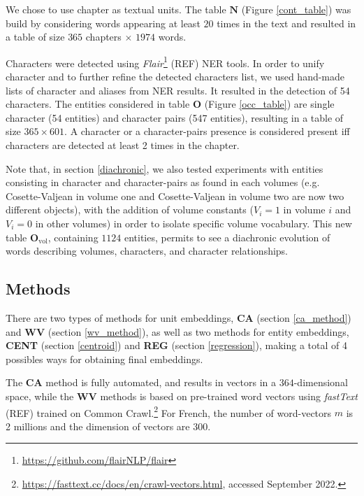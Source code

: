 \documentclass[
twocolumn,
]{ceurart}
\begin{document}
We chose to use chapter as textual units. The table $\mathbf{N}$ (Figure \ref{cont_table}) was build by considering words appearing at least $20$ times in the text and resulted in a table of size $365$ chapters $\times$ $1974$ words.

Characters were detected using \emph{Flair}\footnote{\url{https://github.com/flairNLP/flair}} (REF) NER tools. In order to unify character and to further refine the detected characters list, we used hand-made lists of character and aliases from NER results. It resulted in the detection of 54 characters. The entities considered in table $\mathbf{O}$ (Figure \ref{occ_table}) are single character (54 entities) and character pairs (547 entities), resulting in a table of size $365 \times 601$. A character or a character-pairs presence is considered present iff characters are detected at least 2 times in the chapter. 

Note that, in section \ref{diachronic}, we also tested experiments with entities consisting in character and character-pairs as found in each volumes (e.g. Cosette-Valjean in volume one and Cosette-Valjean in volume two are now two different objects), with the addition of volume constants ($V_i=1$ in volume $i$ and $V_i=0$ in other volumes) in order to isolate specific volume vocabulary. This new table $\mathbf{O}_\text{vol}$, containing $1124$ entities, permits to see a diachronic evolution of words describing volumes, characters, and character relationships. 

\subsection{Methods}

There are two types of methods for unit embeddings, \textbf{CA} (section \ref{ca_method}) and \textbf{WV} (section \ref{wv_method}), as well as two methods for entity embeddings, \textbf{CENT} (section \ref{centroid}) and \textbf{REG} (section \ref{regression}), making a total of 4 possibles ways for obtaining final embeddings. 

The \textbf{CA} method is fully automated, and results in vectors in a $364$-dimensional space, while the $\textbf{WV}$ methods is based on pre-trained word vectors using \emph{fastText} (REF) trained on Common Crawl.\footnote{\url{ https://fasttext.cc/docs/en/crawl-vectors.html}, accessed September 2022.} For French, the number of word-vectors $m$ is 2 millions and the dimension of vectors are $300$. 
\end{document}
